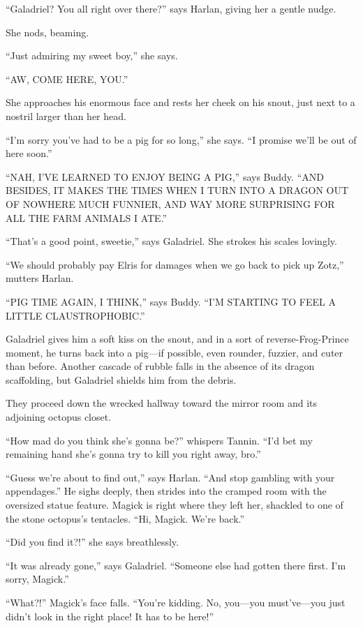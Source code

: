 \documentclass[smalldemyvopaper,11pt,twoside,onecolumn,openright,extrafontsizes]{memoir}
\begin{document}
``Galadriel? You all right over there?'' says Harlan, giving her a
gentle nudge.

She nods, beaming.

``Just admiring my sweet boy,'' she says.

``AW, COME HERE, YOU.''

She approaches his enormous face and rests her cheek on his snout, just
next to a nostril larger than her head.

``I'm sorry you've had to be a pig for so long,'' she says. ``I promise
we'll be out of here soon.''

``NAH, I'VE LEARNED TO ENJOY BEING A PIG,'' says Buddy. ``AND BESIDES,
IT MAKES THE TIMES WHEN I TURN INTO A DRAGON OUT OF NOWHERE MUCH
FUNNIER, AND WAY MORE SURPRISING FOR ALL THE FARM ANIMALS I ATE.''

``That's a good point, sweetie,'' says Galadriel. She strokes his scales
lovingly.

``We should probably pay Elris for damages when we go back to pick up
Zotz,'' mutters Harlan.

``PIG TIME AGAIN, I THINK,'' says Buddy. ``I'M STARTING TO FEEL A LITTLE
CLAUSTROPHOBIC.''

Galadriel gives him a soft kiss on the snout, and in a sort of
reverse-Frog-Prince moment, he turns back into a pig---if possible, even
rounder, fuzzier, and cuter than before. Another cascade of rubble falls
in the absence of its dragon scaffolding, but Galadriel shields him from
the debris.

They proceed down the wrecked hallway toward the mirror room and its
adjoining octopus closet.

``How mad do you think she's gonna be?'' whispers Tannin. ``I'd bet my
remaining hand she's gonna try to kill you right away, bro.''

``Guess we're about to find out,'' says Harlan. ``And stop gambling with
your appendages.'' He sighs deeply, then strides into the cramped room
with the oversized statue feature. Magick is right where they left her,
shackled to one of the stone octopus's tentacles. ``Hi, Magick. We're
back.''

``Did you find it?!'' she says breathlessly.

``It was already gone,'' says Galadriel. ``Someone else had gotten there
first. I'm sorry, Magick.''

``What?!'' Magick's face falls. ``You're kidding. No, you---you
must've---you just didn't look in the right place! It has to be here!''
\end{document}
